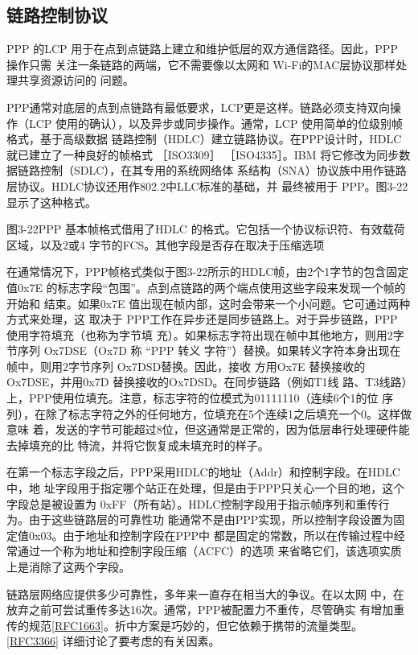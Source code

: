 \subsection{链路控制协议}

PPP 的LCP 用于在点到点链路上建立和维护低层的双方通信路径。因此，PPP 操作只需
关注一条链路的两端，它不需要像以太网和 Wi-Fi的MAC层协议那样处理共享资源访问的
问题。

PPP通常对底层的点到点链路有最低要求，LCP更是这样。链路必须支持双向操作（LCP
使用的确认），以及异步或同步操作。通常，LCP 使用简单的位级别帧格式，基于高级数据
链路控制（HDLC）建立链路协议。在PPP设计时，HDLC就已建立了一种良好的帧格式
［ISO3309］ ［ISO4335］。IBM 将它修改为同步数据链路控制（SDLC），在其专用的系统网络体
系结构（SNA）协议族中用作链路层协议。HDLC协议还用作802.2中LLC标准的基础，并
最终被用于 PPP。图3-22显示了这种格式。

图3-22PPP 基本帧格式借用了HDLC 的格式。它包括一个协议标识符、有效载荷区域，以及2或4
字节的FCS。其他字段是否存在取决于压缩选项

在通常情况下，PPP帧格式类似于图3-22所示的HDLC帧，由2个1字节的包含固定
值0x7E 的标志字段“包围”。点到点链路的两个端点使用这些字段来发现一个帧的开始和
结束。如果0x7E 值出现在帧内部，这时会带来一个小问题。它可通过两种方式来处理，这
取决于 PPP工作在异步还是同步链路上。对于异步链路，PPP 使用字符填充（也称为字节填
充）。如果标志字符出现在帧中其他地方，则用2字节序列 Ox7DSE（Ox7D 称 “PPP 转义
字符”）替换。如果转义字符本身出现在帧中，则用2字节序列 Ox7DSD替换。因此，接收
方用Ox7E 替换接收的Ox7DSE，并用0x7D 替换接收的Ox7DSD。在同步链路（例如T1线
路、T3线路）上，PPP使用位填充。注意，标志字符的位模式为01111110（连续6个1的位
序列），在除了标志字符之外的任何地方，位填充在5个连续1之后填充一个0。这样做意味
着，发送的字节可能超过8位，但这通常是正常的，因为低层串行处理硬件能去掉填充的比
特流，并将它恢复成未填充时的样子。

在第一个标志字段之后，PPP采用HDLC的地址（Addr）和控制字段。在HDLC中，地
址字段用于指定哪个站正在处理，但是由于PPP只关心一个目的地，这个字段总是被设置为
0xFF（所有站）。HDLC控制字段用于指示帧序列和重传行为。由于这些链路层的可靠性功
能通常不是由PPP实现，所以控制字段设置为固定值0x03。由于地址和控制字段在PPP中
都是固定的常数，所以在传输过程中经常通过一个称为地址和控制字段压缩（ACFC）的选项
来省略它们，该选项实质上是消除了这两个字段。

\begin{tcolorbox}
  链路层网络应提供多少可靠性，多年来一直存在相当大的争议。在以太网
  中，在放弃之前可尝试重传多达16次。通常，PPP被配置力不重传，尽管确实
  有增加重传的规范\href{https://www.rfc-editor.org/rfc/rfc1663}{[RFC1663]}。折中方案是巧妙的，但它依赖于携带的流量类型。
  \href{https://www.rfc-editor.org/rfc/rfc3366}{[RFC3366]} 详细讨论了要考虑的有关因素。
\end{tcolorbox}

